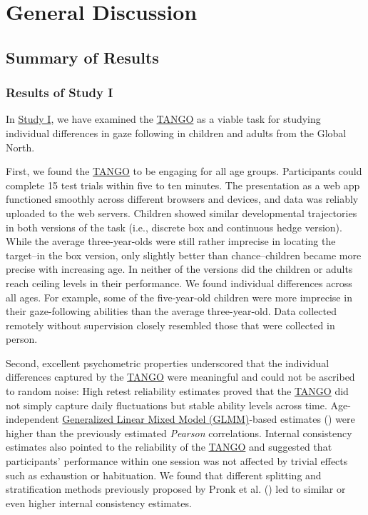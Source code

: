 \documentclass[
]{scrbook}
\begin{document}
\chapter{General Discussion}\label{discussion}

\section{Summary of Results}\label{summary-of-results}

\subsection{Results of Study I}\label{results-studyI}

In \hyperref[studyI]{Study I}, we have examined the \hyperref[acronyms_TANGO]{TANGO} as a viable task for studying individual differences in gaze following in children and adults from the Global North.

First, we found the \hyperref[acronyms_TANGO]{TANGO} to be engaging for all age groups. Participants could complete 15 test trials within five to ten minutes. The presentation as a web app functioned smoothly across different browsers and devices, and data was reliably uploaded to the web servers. Children showed similar developmental trajectories in both versions of the task (i.e., discrete box and continuous hedge version). While the average three-year-olds were still rather imprecise in locating the target\thinspace --\thinspace in the box version, only slightly better than chance\thinspace --\thinspace children became more precise with increasing age. In neither of the versions did the children or adults reach ceiling levels in their performance. We found individual differences across all ages. For example, some of the five-year-old children were more imprecise in their gaze-following abilities than the average three-year-old. Data collected remotely without supervision closely resembled those that were collected in person.

Second, excellent psychometric properties underscored that the individual differences captured by the \hyperref[acronyms_TANGO]{TANGO} were meaningful and could not be ascribed to random noise: High retest reliability estimates proved that the \hyperref[acronyms_TANGO]{TANGO} did not simply capture daily fluctuations but stable ability levels across time. Age-independent \hyperref[acronyms_GLMM]{Generalized Linear Mixed Model (GLMM)}-based estimates () were higher than the previously estimated \emph{Pearson} correlations. Internal consistency estimates also pointed to the reliability of the \hyperref[acronyms_TANGO]{TANGO} and suggested that participants' performance within one session was not affected by trivial effects such as exhaustion or habituation. We found that different splitting and stratification methods previously proposed by Pronk et al. () led to similar or even higher internal consistency estimates.
\end{document}
